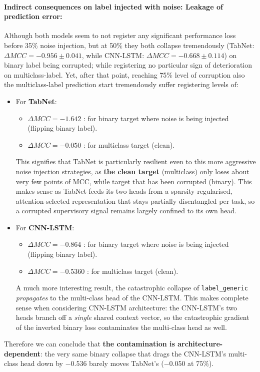 \documentclass[../main.tex]{subfiles}
\begin{document}
\paragraph{Indirect consequences on label injected with noise: Leakage of prediction error:}
Although both models seem to not register any significant performance loss before 35\% noise injection, but at 50\% they both collapse tremendously (TabNet: $\Delta MCC = -0.956{\pm}0.041$, while CNN-LSTM: $\Delta MCC = -0.668{\pm}0.114$) on binary label being corrupted; while registering no particular sign of deterioration on multiclass-label. Yet, after that point, reaching 75\% level of corruption also the multiclass-label prediction start tremendously suffer registering levels of:
\begin{itemize}
    \item For \textbf{TabNet}:
    \begin{itemize}
        \item $\Delta MCC = -1.642$ : for binary target where noise is being injected (flipping binary label).
        \item $\Delta MCC = -0.050$ : for multiclass target (clean).
    \end{itemize}
    This signifies that TabNet is particularly resilient even to this more aggressive noise injection strategies, as \textbf{the clean target} (multiclass) only loses about very few points of MCC, while target that has been corrupted (binary). This makes sense as TabNet feeds its two heads from a sparsity-regularised, attention-selected representation that stays partially disentangled per task, so a corrupted supervisory signal remains largely confined to its own head.
    
    \item For \textbf{CNN-LSTM}:
    \begin{itemize}
        \item $\Delta MCC = -0.864$ : for binary target where noise is being injected (flipping binary label).
        \item $\Delta MCC = -0.5360$ : for multiclass target (clean).
    \end{itemize}
    A much more interesting result, the catastrophic collapse of \texttt{label\_generic} \emph{propagates} to the multi-class head of the CNN-LSTM. This makes complete sense when considering CNN-LSTM architecture: the CNN-LSTM's two heads branch off a \emph{single} shared context vector, so the catastrophic gradient of the inverted binary loss contaminates the multi-class head as well. 
\end{itemize}
Therefore we can conclude that \textbf{the contamination is architecture-dependent}: the very same binary collapse that drags the CNN-LSTM's multi-class head down by $-0.536$ barely moves TabNet's ($-0.050$ at $75\%$).  
\end{document}
